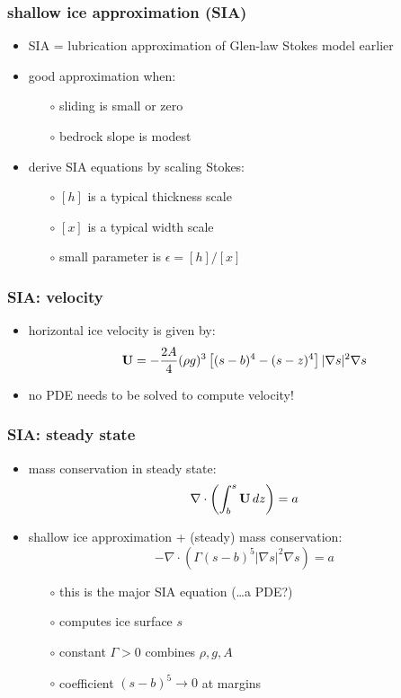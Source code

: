 \documentclass{beamer}
\newcommand{\Div}{\nabla\cdot}
\newcommand{\eps}{\epsilon}
\begin{document}
\begin{frame}
  \frametitle{shallow ice approximation (SIA)}

\begin{itemize}
\item SIA = lubrication approximation of Glen-law Stokes model earlier
\item good approximation when:
  \begin{itemize}
  \item[$\circ$] sliding is small or zero
  \item[$\circ$] bedrock slope is modest
  \end{itemize}
\item derive SIA equations by scaling Stokes:
  \begin{itemize}
  \item[$\circ$] $[h]$ is a typical thickness scale
  \item[$\circ$] $[x]$ is a typical width scale
  \item[$\circ$] small parameter is $\eps = [h] / [x]$
  \end{itemize}
\end{itemize}
\end{frame}



\begin{frame}
  \frametitle{SIA: velocity}
 
\begin{itemize}
\item horizontal ice velocity is given by: 
  $${\bf U}  =  - \frac{2 A}{4} (\rho g)^{3} \left[ (s-b)^4 - (s - z)^4  \right] 
|\nabla s |^{2} \nabla s$$
\item no PDE needs to be solved to compute velocity!
\end{itemize}
\end{frame}



\begin{frame}
  \frametitle{SIA: steady state}

\begin{itemize}
\item mass conservation in steady state: 
  $$\Div \left(  \int_b^s {\bf U}\, dz \right)  =  a$$
\item shallow ice approximation + (steady) mass conservation:
  $$- \Div \left(\Gamma (s-b)^5 | \nabla s |^2 \nabla s  \right) =  a$$
  \begin{itemize}
  \vspace{-0.2in}
  \item[$\circ$] this is the major SIA equation (\dots a PDE?)
  \item[$\circ$] computes ice surface $s$
  \item[$\circ$] constant $\Gamma > 0$ combines $\rho,g,A$
  \item[$\circ$] coefficient $(s-b)^5 \to 0$ at margins
  \end{itemize}
\end{itemize}
\end{frame}
\end{document}
